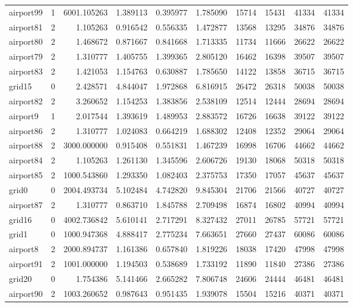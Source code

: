 \begin{longtable}{|l|r|r|r|r|r|r|r|r|r|}
airport99 & 1 & 6001.105263 & 1.389113 & 0.395977 & 1.785090 & 15714 & 15431 & 41334 & 41334 \\
airport81 & 2 & 1.105263 & 0.916542 & 0.556335 & 1.472877 & 13568 & 13295 & 34876 & 34876 \\
airport80 & 2 & 1.468672 & 0.871667 & 0.841668 & 1.713335 & 11734 & 11666 & 26622 & 26622 \\
airport79 & 2 & 1.310777 & 1.405755 & 1.399365 & 2.805120 & 16462 & 16398 & 39507 & 39507 \\
airport83 & 2 & 1.421053 & 1.154763 & 0.630887 & 1.785650 & 14122 & 13858 & 36715 & 36715 \\
grid15 & 0 & 2.428571 & 4.844047 & 1.972868 & 6.816915 & 26472 & 26318 & 50038 & 50038 \\
airport82 & 2 & 3.260652 & 1.154253 & 1.383856 & 2.538109 & 12514 & 12444 & 28694 & 28694 \\
airport9 & 1 & 2.017544 & 1.393619 & 1.489953 & 2.883572 & 16726 & 16638 & 39122 & 39122 \\
airport86 & 2 & 1.310777 & 1.024083 & 0.664219 & 1.688302 & 12408 & 12352 & 29064 & 29064 \\
airport88 & 2 & 3000.000000 & 0.915408 & 0.551831 & 1.467239 & 16998 & 16706 & 44662 & 44662 \\
airport84 & 2 & 1.105263 & 1.261130 & 1.345596 & 2.606726 & 19130 & 18068 & 50318 & 50318 \\
airport85 & 2 & 1000.543860 & 1.293350 & 1.082403 & 2.375753 & 17350 & 17057 & 45637 & 45637 \\
grid0 & 0 & 2004.493734 & 5.102484 & 4.742820 & 9.845304 & 21706 & 21566 & 40727 & 40727 \\
airport87 & 2 & 1.310777 & 0.863710 & 1.845788 & 2.709498 & 16874 & 16802 & 40994 & 40994 \\
grid16 & 0 & 4002.736842 & 5.610141 & 2.717291 & 8.327432 & 27011 & 26785 & 57721 & 57721 \\
grid1 & 0 & 1000.947368 & 4.888417 & 2.775234 & 7.663651 & 27660 & 27437 & 60086 & 60086 \\
airport8 & 2 & 2000.894737 & 1.161386 & 0.657840 & 1.819226 & 18038 & 17420 & 47998 & 47998 \\
airport91 & 2 & 1001.000000 & 1.194503 & 0.538689 & 1.733192 & 11890 & 11840 & 27386 & 27386 \\
grid20 & 0 & 1.754386 & 5.141466 & 2.665282 & 7.806748 & 24606 & 24444 & 46481 & 46481 \\
airport90 & 2 & 1003.260652 & 0.987643 & 0.951435 & 1.939078 & 15504 & 15216 & 40371 & 40371 \\

\end{longtable}
